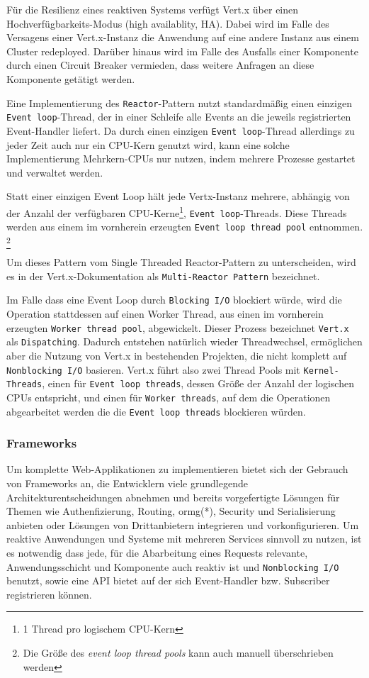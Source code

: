 Für die Resilienz eines reaktiven Systems verfügt Vert.x über einen Hochverfügbarkeits-Modus (high availablity, HA).
Dabei wird im Falle des Versagens einer Vert.x-Instanz die Anwendung auf eine andere Instanz aus einem Cluster redeployed.
Darüber hinaus wird im Falle des Ausfalls einer Komponente durch einen Circuit Breaker vermieden, dass weitere Anfragen an diese
Komponente getätigt werden.\newline

Eine Implementierung des \verb|Reactor|-Pattern nutzt standardmäßig einen einzigen \verb|Event loop|-Thread, der in einer Schleife alle
Events an die jeweils registrierten Event-Handler liefert.
Da durch einen einzigen \verb|Event loop|-Thread allerdings zu jeder Zeit auch nur ein CPU-Kern genutzt wird, kann
eine solche Implementierung Mehrkern-CPUs nur nutzen, indem mehrere Prozesse gestartet und verwaltet werden.

Statt einer einzigen Event Loop hält jede Vertx-Instanz mehrere, abhängig von der Anzahl der verfügbaren CPU-Kerne\footnote{1 Thread pro logischem CPU-Kern},
\verb|Event loop|-Threads. Diese Threads werden aus einem im vornherein erzeugten \verb|Event loop thread pool| entnommen.
\footnote{Die Größe des \textit{event loop thread pools} kann auch manuell überschrieben werden}

Um dieses Pattern vom Single Threaded Reactor-Pattern zu unterscheiden, wird es in der Vert.x-Dokumentation als \verb|Multi-Reactor Pattern| bezeichnet.
\parencite{Vert.xDocs}  \newline

Im Falle dass eine Event Loop durch \verb|Blocking I/O| blockiert würde, wird die Operation stattdessen auf einen
Worker Thread, aus einen im vornherein erzeugten \verb|Worker thread pool|, abgewickelt. Dieser Prozess bezeichnet \verb|Vert.x| als \verb|Dispatching|.
Dadurch entstehen natürlich wieder Threadwechsel, ermöglichen aber die Nutzung von Vert.x in bestehenden Projekten, die nicht komplett
auf \verb|Nonblocking I/O| basieren\parencite[Seite 2]{VertxArticle}.
Vert.x führt also zwei Thread Pools mit \verb|Kernel-Threads|, einen für \verb|Event loop threads|, dessen Größe der Anzahl der logischen CPUs entspricht,
und einen für \verb|Worker threads|, auf dem die Operationen abgearbeitet werden die die \verb|Event loop threads| blockieren würden.
\parencite{Vert.xOptions}

\subsubsection{Frameworks}
\label{subsubsec:frameworks}
Um komplette Web-Applikationen zu implementieren bietet sich der Gebrauch von Frameworks an, die Entwicklern viele grundlegende Architekturentscheidungen
abnehmen und bereits vorgefertigte Lösungen für Themen wie Authenfizierung, Routing, \Gls{ormg}(*), Security und Serialisierung anbieten oder
Lösungen von Drittanbietern integrieren und vorkonfigurieren.
Um reaktive Anwendungen und Systeme mit mehreren Services sinnvoll zu nutzen, ist es notwendig dass jede, für die Abarbeitung eines Requests relevante,
Anwendungsschicht und Komponente auch reaktiv ist und \verb|Nonblocking I/O| benutzt, sowie eine API bietet auf der
sich Event-Handler bzw. Subscriber registrieren können.

